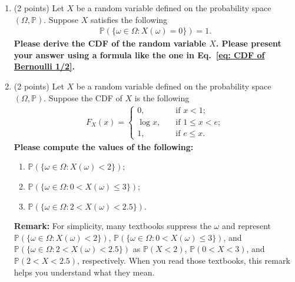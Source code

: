 \documentclass[11pt]{article}
\begin{document}
\begin{enumerate}
\item (2 points) Let $X$ be a random variable defined on the probability space $(\Omega,\mathbb{P})$. Suppose $X$ satisfies the following
\begin{align*}
    \mathbb{P}(\{\omega\in\Omega: X(\omega)=0\})=1.
\end{align*}
\textbf{Please derive the CDF of the random variable $X$. Please present your answer using a formula like the one in Eq.~\eqref{eq: CDF of Bernoulli 1/2}.}


\item (2 points) Let $X$ be a random variable defined on the probability space $(\Omega,\mathbb{P})$. Suppose the CDF of $X$ is the following
\begin{align*}
    F_X(x)=\left\{
    \begin{aligned}
    0,\ \ \ &\text{ if }x<1;\\
    \log x,\ \ \ &\text{ if }1\le x<e;\\
    1,\ \ \ &\text{ if }e\le x.
    \end{aligned}
    \right.
\end{align*}
\textbf{Please compute the values of the following:}
\begin{enumerate}
    \item $\mathbb{P}(\{\omega\in\Omega: X(\omega)<2\})$;
    \item $\mathbb{P}(\{\omega\in\Omega: 0<X(\omega)\le3\})$;
    \item $\mathbb{P}(\{\omega\in\Omega: 2<X(\omega)<2.5\})$.
\end{enumerate}
\textbf{Remark:} For simplicity, many textbooks suppress the $\omega$ and represent  $\mathbb{P}(\{\omega\in\Omega: X(\omega)<2\})$, $\mathbb{P}(\{\omega\in\Omega: 0<X(\omega)\le3\})$, and $\mathbb{P}(\{\omega\in\Omega: 2<X(\omega)<2.5\})$ as $\mathbb{P}(X<2)$, $\mathbb{P}(0<X<3)$, and $\mathbb{P}(2<X<2.5)$, respectively. When you read those textbooks, this remark helps you understand what they mean.

\end{enumerate}


\newpage
\end{document}
